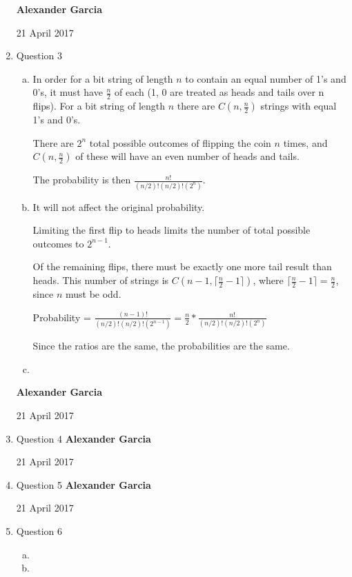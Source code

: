 \documentclass[11pt]{article}
\begin{document}
\begin{enumerate}
\begin{enumerate}[(a)]
			\end{enumerate}
\newpage
\textbf{Alexander Garcia}

21 April 2017 \\

		\item Question 3

			\begin{enumerate}[(a)]

				\item In order for a bit string of length $n$ to contain an equal number of 1's and 0's,
					it must have $\frac{n}{2}$ of each (1, 0 are treated as heads and tails over n flips).
					For a bit string of length $n$ there are $C(n, \frac{n}{2})$ strings with equal 1's and
					0's.

					There are $2^n$ total possible outcomes of flipping the coin $n$ times, and
					$C(n, \frac{n}{2})$ of these will have an even number of heads and tails.

					The probability is then $\frac{n!}{(n/2)!(n/2)!(2^n)} $. \\

				\item It will not affect the original probability.

					Limiting the first flip to heads limits the number of total
					possible outcomes to $2^{n-1}$.

					Of the remaining flips, there must be exactly one more tail result than heads.
					This number of strings is $C(n-1, \lceil{\frac{n}{2} -1}\rceil)$, where
					$\lceil{\frac{n}{2} -1}\rceil = \frac{n}{2}$, since $n$ must be odd.

					Probability = $\frac{(n-1)!}{(n/2)!(n/2)!(2^{n-1}) } =
					\frac{n}{2} * \frac{n!}{(n/2)!(n/2)!(2^n)} $

					Since the ratios are the same, the probabilities are the same. \\

				\item

			\end{enumerate}
\newpage
\textbf{Alexander Garcia}

21 April 2017 \\

		\item Question 4
\newpage
\textbf{Alexander Garcia}

21 April 2017 \\

		\item Question 5
\newpage
\textbf{Alexander Garcia}

21 April 2017 \\

		\item Question 6

			\begin{enumerate}[(a)]

				\item

				\item

			\end{enumerate}

	\end{enumerate}
\end{document}
